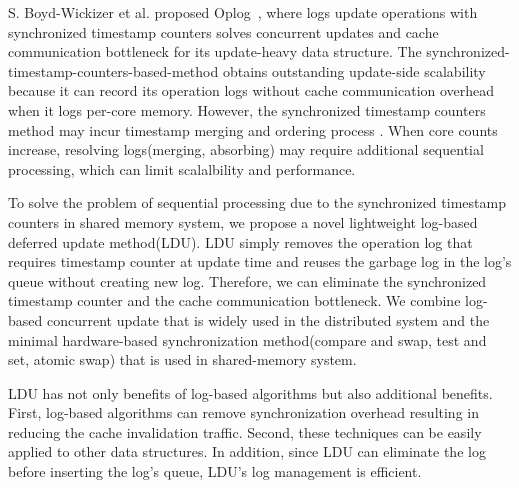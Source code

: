 S. Boyd-Wickizer et al. proposed Oplog~\cite{SilasBoydWickizerPth}, where logs
update operations with synchronized timestamp counters solves concurrent
updates and cache communication bottleneck for its update-heavy data structure.
The synchronized-timestamp-counters-based-method obtains outstanding
update-side scalability because it can record its operation logs without
cache communication overhead when it logs per-core memory.
However, the synchronized timestamp counters method may incur timestamp merging
and ordering process .
When core counts increase, resolving logs(merging, absorbing) may require
additional sequential processing, which can limit scalalbility and performance.

%
To solve the problem of sequential processing due to the synchronized timestamp
counters in shared memory system, we propose a novel lightweight log-based
deferred update method(LDU).
LDU simply removes the operation log that requires timestamp counter at
update time and reuses the garbage log in the log's queue without creating new
log.
Therefore, we can eliminate the synchronized timestamp counter and the cache
communication bottleneck.
We combine log-based concurrent update that is widely used in
the distributed system and the minimal hardware-based synchronization
method(compare and swap, test and set, atomic swap) that is used in shared-memory system.

LDU has not only benefits of log-based algorithms but also additional benefits.
First, log-based algorithms can remove synchronization overhead resulting in
reducing the cache invalidation traffic.
Second, these techniques can be easily applied to other data structures.
In addition, since LDU can eliminate the log before inserting the log's queue,
LDU's log management is efficient.


